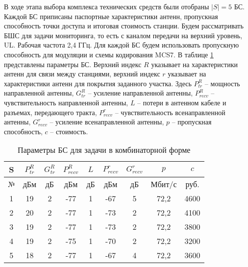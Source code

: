 
В ходе этапа выбора комплекса технических средств были отобраны $|S| = 5$ БС. Каждой БС приписаны паспортные характеристики антенн, пропускная способность точки доступа и итоговая стоимость станции.  Будем рассматривать БШС для задачи мониторинга, то есть с каналом передачи на верхний уровень, UL. Рабочая частота 2,4 ГГц. Для каждой БС будем использовать пропускную способность для модуляции и схемы кодирования MCS7.  В таблице \cref{tab:sta_parameters_bnb} представлены параметры БС. Верхний индекс $R$ указывает на характеристики антенн для связи между станциями, верхний индекс $r$ указывает на характеристики антенн для покрытия заданного участка. Здесь $P_{tr}^{R}$ -- мощность направленной антенны, $G_{tr}^R$ -- усиление направленной антенны, $P_{recv}^R$ -- чувствительность направленной антенны, $L$  -- потери в антенном кабеле и разъемах, передающего тракта, $P_{recv}^r$ -- чувствительность всенаправленной антенны, $G_{recv}^r$ -- усиление всенаправленной антенны,  $p$ – пропускная способность, $c$ – стоимость.

\begin{table}[h!]\centering
  \begin{tabular}{|c||c|c|c|c|c|c|c|c|}\hline
      
      S&	$P_{tr}^R$&	$G_{tr}^R$&	$P_{recv}^R$&	$L$&	$P_{recv}^r$&	$G_{recv}^r$&	$p$&	$c$ \\
      \hline
      №&	дБм&	дБ&	дБм&	дБ&	дБм&	дБ&	Мбит/с&	руб. \\
      \hline
      1&	19&	2&	-77&	1&	-67&	5&	72,2& 4600 \\
      2&	20&	2&	-77&	1&	-73&	2&	72,2&	4100 \\
      3&	19&	2&	-77&	1&	-73&	2&	72,2&	3800 \\
      4&	19&	2&	-75&	1&	-70&	2&	72,2&	3200 \\
      5&	18&	2&	-77&	1&	-67&	4&	72,2&	3600 \\
      \hline
  \end{tabular}\caption{Параметры БС для задачи в комбинаторной форме}\label{tab:sta_parameters_bnb}
\end{table}


